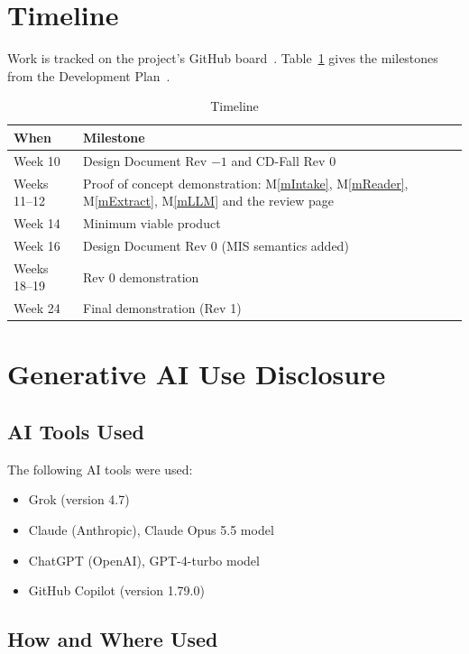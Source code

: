 \documentclass[12pt, titlepage]{article}
\newcommand{\mref}[1]{M\ref{#1}}
\begin{document}
\section{Timeline} \label{SecTimeline}

Work is tracked on the project's GitHub board~\citep{TeamBVSH2026DP}.
Table~\ref{TblTimeline} gives the milestones from the Development
Plan~\citep{TeamBVSH2026DP}.

\begin{table}[H]
\centering
\begin{tabular}{p{} p{}}
\toprule
\textbf{When} & \textbf{Milestone}\\
\midrule
Week 10 & Design Document Rev $-1$ and CD-Fall Rev 0\\
Weeks 11--12 & Proof of concept demonstration: \mref{mIntake}, \mref{mReader},
\mref{mExtract}, \mref{mLLM} and the review page\\
Week 14 & Minimum viable product\\
Week 16 & Design Document Rev 0 (MIS semantics added)\\
Weeks 18--19 & Rev 0 demonstration\\
Week 24 & Final demonstration (Rev 1)\\
\bottomrule
\end{tabular}
\caption{Timeline}
\label{TblTimeline}
\end{table}

\section{Generative AI Use Disclosure}


\subsection{AI Tools Used}

The following AI tools were used:
\begin{itemize}
    \item Grok (version 4.7)
    \item Claude (Anthropic), Claude Opus 5.5 model
    \item ChatGPT (OpenAI), GPT-4-turbo model
    \item GitHub Copilot (version 1.79.0)
\end{itemize}
\subsection{How and Where Used}
\end{document}

